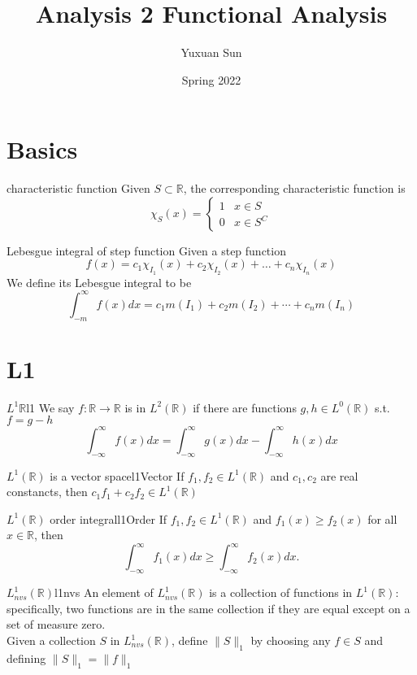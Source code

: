 \documentclass[a4paper]{article}
\title{Analysis 2 Functional Analysis}
\author{Yuxuan Sun}
\date{Spring 2022}
\newcommand{\R}{\mathbb{R}}
\begin{document}
\maketitle
\tableofcontents

\newpage

\section{Basics}
\begin{Definition}{characteristic function}{}
Given $S \subset \R$, the corresponding characteristic function is \[
	\chi_S(x) = \begin{cases}
		1 & x \in S \\
		0 & x \in S^C
	\end{cases}
\] 	
\end{Definition}

\begin{Definition}{Lebesgue integral of step function}{}
	Given a step function \[
	f(x)=c_{1} \chi_{I_{1}}(x)+c_{2} \chi_{I_{2}}(x)+\ldots+c_{n} \chi_{I_{n}}(x)
	\] We define its Lebesgue integral to be \[
	\int_{-m}^{\infty} f(x) d x=c_{1} m\left(I_{1}\right)+c_{2} m\left(I_{2}\right)+\cdots+c_{n} m\left(I_{n}\right)
	\] 
\end{Definition}

\section{L1}
\begin{Definition}{$L^1{\R}$}{l1}
	We say $f:\R\to \R$ is in $L^2(\R)$ if there are functions  $g,h \in  L^0(\R)$ s.t. $f=g-h$
	\[\int_{-\infty}^{\infty} f(x)dx = \int_{-\infty}^{\infty} g(x)dx - \int_{-\infty}^{\infty} h(x)dx    
\]
\end{Definition}
\begin{Theorem}{$L^1(\R)$ is a vector space}{l1Vector}
	If $f_1,f_2\in L^1(\R)$ and $c_1,c_2$ are real constancts, then $c_1f_1+c_2f_2 \in L^1(\R)$
\end{Theorem}
\begin{Theorem}{$L^1(\R)$ order integral}{l1Order}
	If $f_1,f_2 \in  L^1(\R)$ and $f_1(x) \ge f_2(x)$ for all $x \in \R$, then \[
		\int_{-\infty}^{\infty} f_1(x) dx \ge \int_{-\infty}^{\infty} f_2(x)dx  
	.\] 
\end{Theorem}
\begin{Definition}{$L^1_{nvs}(\R)$}{l1nvs}
	An element of $L^1_{nvs}(\R)$ is a collection of functions in $L^1(\R)$: specifically, two functions are in the same collection if they are equal except on a set of measure zero. \\
	Given a collection  $S$ in  $L^1_{nvs}(\R)$, define $\|S\|_{1}$ by choosing any $f \in  S$ and defining $ \|S\|_{1}=  \|f\|_{1}$
\end{Definition}
\end{document}
